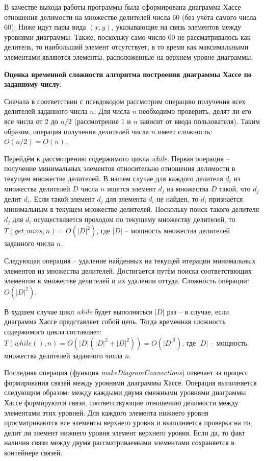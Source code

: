 \documentclass[spec, och, otchet, hidelinks]{SCWorks}
\begin{document}
\par В качестве выхода работы программы была сформирована диаграмма Хассе
отношения делимости на множестве делителей числа 60 (без учёта самого числа 60).
Ниже идут пары вида $(x, y)$, указывающие на связь элементов между уровнями
диаграммы. Также, поскольку само число 60 не рассматривалось как делитель, то
наибольший элемент отсутствует, в то время как максимальными элементами являются
элементы, расположенные на верхнем уровне диаграммы. \\

\par \textbf{Оценка временной сложности алгоритма построения диаграммы Хассе по
  заданному числу.}
\par Сначала в соответствии с псевдокодом рассмотрим операцию получения всех
делителей заданного числа $n$. Для числа $n$ необходимо
проверить, делят ли его все числа от 2 до $n / 2$ (рассмотрение 1 и $n$ зависит
от ввода пользователя). Таким образом, операция получения делителей числа $n$
имеет сложность: $O(n / 2) = O(n)$.

\par Перейдём к рассмотрению содержимого цикла \textit{while}. Первая операция
-- получение минимальных элементов относительно отношения делимости в текущем
множестве делителей. В нашем случае для каждого делителя $d_i$ из множества
делителей $D$ числа $n$ ищется элемент $d_j$ из множества $D$ такой, что $d_j$
делит $d_i$. Если такой элемент $d_j$ для элемента $d_i$ не найден, то $d_i$
признаётся минимальным в текущем множестве делителей. Поскольку поиск такого
делителя $d_j$ для $d_i$ осуществляется проходом по текущему множеству
делителей, то $T(get\_mins, n) = O(|D|^2)$, где $|D|$ -- мощность множества
делителей заданного числа $n$.

\par Следующая операция -- удаление найденных на текущей итерации минимальных
элементов из множества делителей. Достигается путём поиска соответствющих
элементов в множестве делителей и их удалении оттуда. Сложность операции: $O(|D|^2)$.

\par В худшем случае цикл \textit{while} будет выполняться $|D|$ раз -- в
случае, если диаграмма Хассе представляет собой цепь. Тогда временная сложность
содержимого цикла составляет: $T(while(), n) = O(|D|(|D|^2 + |D|^2)) =
O(|D|^3)$, где $|D|$ -- мощность множества делителей заданного числа $n$.

\par Последняя операция (функция \textit{makeDiagramConnections}) отвечает
за процесс формирования связей между уровнями диаграммы Хассе. Операция
выполняется следующим образом: между каждыми двумя смежными уровнями диаграммы
Хассе формируются связи, соответствующие отношению делимости между элементами
этих уровней. Для каждого элемента нижнего уровня просматриваются все элементы
верхнего уровня и выполняется проверка на то, делит ли элемент нижнего уровня
элемент верхнего уровня. Если да, то факт наличия связи между двумя
рассматриваемыми элементами сохраняется в контейнере связей.
\end{document}
